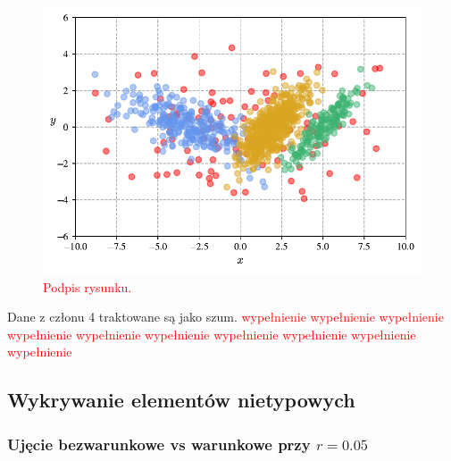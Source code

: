 \documentclass[12pt,a4paper,oneside]{book}
\theoremstyle{definition}
\begin{document}
\begin{figure}[H]
    \centering
    \includegraphics[scale=0.7]{synthetic_data}
    \vspace{-0.5cm} 
    \caption{\textcolor{red}{Podpis rysunku.}}
    \label{fig:synthetic_data}
\end{figure}

Dane z członu 4 traktowane są jako szum. \textcolor{red}{wypełnienie wypełnienie wypełnienie wypełnienie wypełnienie wypełnienie wypełnienie wypełnienie wypełnienie wypełnienie}

\subsection*{Wykrywanie elementów nietypowych}

\subsubsection*{Ujęcie bezwarunkowe vs warunkowe przy $r=0.05$}
\end{document}

